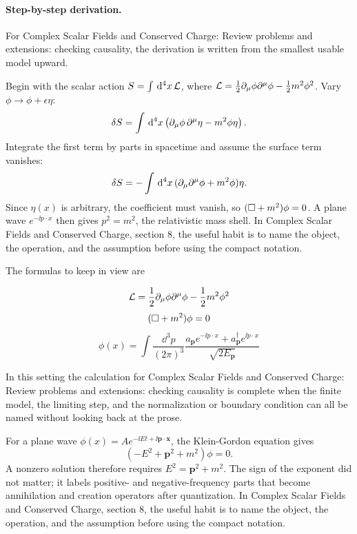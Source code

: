 \paragraph{Step-by-step derivation.}

For Complex Scalar Fields and Conserved Charge: Review problems and extensions: checking causality, the derivation is written from the smallest usable model upward.

Begin with the scalar action \(S=\int\,\mathrm d^4x\,\mathcal L\), where \(\mathcal L=\frac12\partial_\mu\phi\partial^\mu\phi-\frac12m^2\phi^2\).  Vary \(\phi\to\phi+\epsilon\eta\):
\[
  \delta S=\int\,\mathrm d^4x\left(\partial_\mu\phi\,\partial^\mu\eta-m^2\phi\eta\right).
\]
Integrate the first term by parts in spacetime and assume the surface term vanishes:
\[
  \delta S=-\int\,\mathrm d^4x\,(\partial_\mu\partial^\mu\phi+m^2\phi)\eta.
\]
Since \(\eta(x)\) is arbitrary, the coefficient must vanish, so \((\Box+m^2)\phi=0\).  A plane wave \(e^{-\ii p\cdot x}\) then gives \(p^2=m^2\), the relativistic mass shell.  In Complex Scalar Fields and Conserved Charge, section 8, the useful habit is to name the object, the operation, and the assumption before using the compact notation.

The formulas to keep in view are

\[
  \mathcal L=\frac12\partial_\mu\phi\partial^\mu\phi-\frac12m^2\phi^2
\]
\[
  (\Box+m^2)\phi=0
\]
\[
  \phi(x)=\int\frac{\dd^3p}{(2\pi)^3}\frac{a_{\bm p}e^{-\ii p\cdot x}+a_{\bm p}^\dagger e^{\ii p\cdot x}}{\sqrt{2E_{\bm p}}}
\]

In this setting the calculation for Complex Scalar Fields and Conserved Charge: Review problems and extensions: checking causality is complete when the finite model, the limiting step, and the normalization or boundary condition can all be named without looking back at the prose.




\begin{example}
For a plane wave \(\phi(x)=Ae^{-\ii Et+\ii\bm p\cdot\bm x}\), the Klein-Gordon equation gives
\[
  (-E^2+\bm p^2+m^2)\phi=0.
\]
A nonzero solution therefore requires \(E^2=\bm p^2+m^2\).  The sign of the exponent did not matter; it labels positive- and negative-frequency parts that become annihilation and creation operators after quantization.  In Complex Scalar Fields and Conserved Charge, section 8, the useful habit is to name the object, the operation, and the assumption before using the compact notation.
\end{example}




